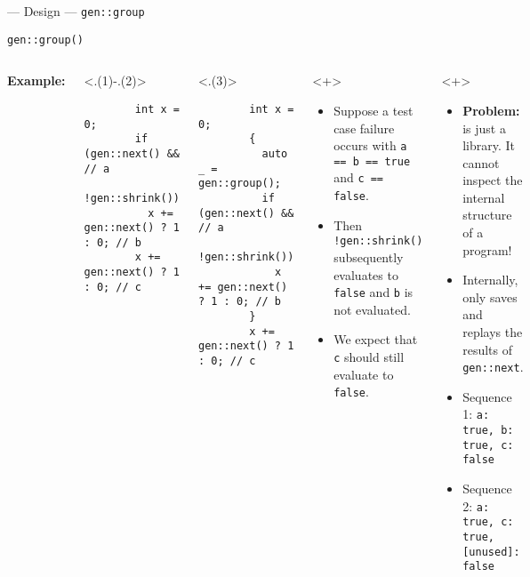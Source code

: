 \begin{frame}[fragile,t]{\halcheck{} --- Design --- \texttt{gen::group}}
  \begin{center}
    \texttt{gen::group()}
  \end{center}

  \begin{columns}[T]
    \textbf{Example:}

    \begin{onlyenv}<.(1)-.(2)>
      \begin{verbatim}
        int x = 0;
        if (gen::next() && // a
            !gen::shrink())
          x += gen::next() ? 1 : 0; // b
        x += gen::next() ? 1 : 0; // c
      \end{verbatim}
    \end{onlyenv}

    \begin{onlyenv}<.(3)>
      \begin{verbatim}
        int x = 0;
        {
          auto _ = gen::group();
          if (gen::next() && // a
              !gen::shrink())
            x += gen::next() ? 1 : 0; // b
        }
        x += gen::next() ? 1 : 0; // c
      \end{verbatim}
    \end{onlyenv}

    \begin{onlyenv}<+>
      \begin{itemize}
        \item Suppose a test case failure occurs with \texttt{a == b == true} and  \texttt{c == false}.
        \item Then \texttt{!gen::shrink()} subsequently evaluates to \texttt{false} and \texttt{b} is not evaluated.
        \item We expect that \texttt{c} should still evaluate to \texttt{false}.
      \end{itemize}
    \end{onlyenv}

    \begin{onlyenv}<+>
      \begin{itemize}
        \item \textbf{Problem:} \halcheck{} is just a library. It cannot inspect the internal structure of a program!
        \item Internally, \halcheck{} only saves and replays the results of \texttt{gen::next}.
        \item Sequence 1: \texttt{{a: true, b: true, c: false}}
        \item Sequence 2: \texttt{{a: true, c: true, [unused]: false}}
      \end{itemize}
    \end{onlyenv}


\end{columns}
\end{frame}

